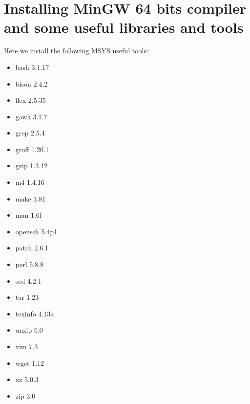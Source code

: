 \documentclass[a4paper]{article}
\begin{document}
\section{Installing MinGW 64 bits compiler and some useful libraries and tools}

Here we install the following MSYS useful tools:
\begin{itemize}
\item bash 3.1.17
\item bison 2.4.2
\item flex 2.5.35
\item gawk 3.1.7
\item grep 2.5.4
\item groff 1.20.1
\item gzip 1.3.12
\item m4 1.4.16
\item make 3.81
\item man 1.6f
\item openssh 5.4p1
\item patch 2.6.1
\item perl 5.8.8
\item sed 4.2.1
\item tar 1.23
\item texinfo 4.13a
\item unzip 6.0
\item vim 7.3
\item wget 1.12
\item xz 5.0.3
\item zip 3.0
\end{itemize}
\end{document}
